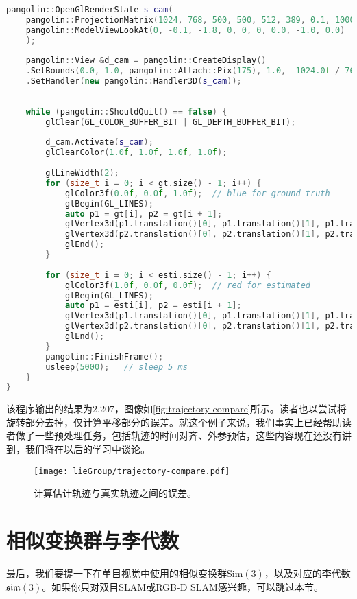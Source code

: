 \begin{lstlisting}[language=c++,caption=slambook/ch4/example/trajectoryError.cpp]
	pangolin::OpenGlRenderState s_cam(
	pangolin::ProjectionMatrix(1024, 768, 500, 500, 512, 389, 0.1, 1000),
	pangolin::ModelViewLookAt(0, -0.1, -1.8, 0, 0, 0, 0.0, -1.0, 0.0)
	);
	
	pangolin::View &d_cam = pangolin::CreateDisplay()
	.SetBounds(0.0, 1.0, pangolin::Attach::Pix(175), 1.0, -1024.0f / 768.0f)
	.SetHandler(new pangolin::Handler3D(s_cam));
	
	
	while (pangolin::ShouldQuit() == false) {
		glClear(GL_COLOR_BUFFER_BIT | GL_DEPTH_BUFFER_BIT);
		
		d_cam.Activate(s_cam);
		glClearColor(1.0f, 1.0f, 1.0f, 1.0f);
		
		glLineWidth(2);
		for (size_t i = 0; i < gt.size() - 1; i++) {
			glColor3f(0.0f, 0.0f, 1.0f);  // blue for ground truth
			glBegin(GL_LINES);
			auto p1 = gt[i], p2 = gt[i + 1];
			glVertex3d(p1.translation()[0], p1.translation()[1], p1.translation()[2]);
			glVertex3d(p2.translation()[0], p2.translation()[1], p2.translation()[2]);
			glEnd();
		}
		
		for (size_t i = 0; i < esti.size() - 1; i++) {
			glColor3f(1.0f, 0.0f, 0.0f);  // red for estimated
			glBegin(GL_LINES);
			auto p1 = esti[i], p2 = esti[i + 1];
			glVertex3d(p1.translation()[0], p1.translation()[1], p1.translation()[2]);
			glVertex3d(p2.translation()[0], p2.translation()[1], p2.translation()[2]);
			glEnd();
		}
		pangolin::FinishFrame();
		usleep(5000);   // sleep 5 ms
	}
}
\end{lstlisting}

该程序输出的结果为2.207，图像如\autoref{fig:trajectory-compare}所示。读者也以尝试将旋转部分去掉，仅计算平移部分的误差。就这个例子来说，我们事实上已经帮助读者做了一些预处理任务，包括轨迹的时间对齐、外参预估，这些内容现在还没有讲到，我们将在以后的学习中谈论。

\begin{figure}[!ht]
	\centering
	\texttt{[image: lieGroup/trajectory-compare.pdf]}
	\caption{计算估计轨迹与真实轨迹之间的误差。}
	\label{fig:trajectory-compare}
\end{figure}

\section{\textsuperscript{\ttfamily *}相似变换群与李代数}
最后，我们要提一下在单目视觉中使用的相似变换群$\mathrm{Sim}(3)$，以及对应的李代数$\mathfrak{sim}(3)$。如果你只对双目SLAM或RGB-D SLAM感兴趣，可以跳过本节。

